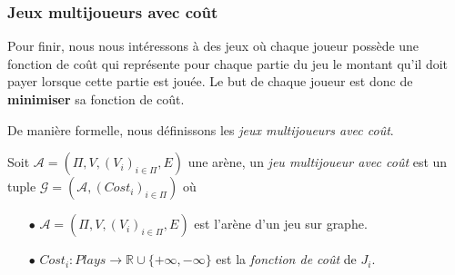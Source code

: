 

\subsubsection{Jeux multijoueurs avec coût}
Pour finir, nous nous intéressons à des jeux où chaque joueur possède une fonction de coût qui représente pour chaque partie du jeu le montant qu'il doit payer lorsque cette partie est jouée. Le but de chaque joueur est donc de \textbf{minimiser} sa fonction de coût.

De manière formelle, nous définissons les \emph{jeux multijoueurs avec coût}.

\begin{defi}
	Soit $\mathcal{A} = (\Pi, V, (V_{i})_{i \in \Pi},E)$ une arène,
	un \textit{jeu multijoueur avec coût} est un tuple $\mathcal{G} = (\mathcal{A},(Cost_{i})_{i \in \Pi})$ où
	\begin{enumerate}
		\item[$\bullet$] $\mathcal{A} = (\Pi ,V ,(V_{i})_{i \in \Pi} ,E )$ est l'arène d'un jeu sur graphe.
		\item[$\bullet$] $Cost_{i}: Plays \rightarrow \mathbb{R} \cup \{ +\infty , -\infty \} $ est la \textit{fonction de coût} de $J_{i}$. 
	\end{enumerate}
\end{defi}




